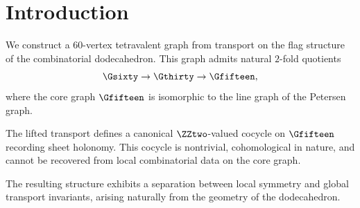 \section{Introduction}

We construct a $60$-vertex tetravalent graph from transport on the flag
structure of the combinatorial dodecahedron. This graph admits natural
$2$-fold quotients
\[
\Gsixty \to \Gthirty \to \Gfifteen,
\]
where the core graph $\Gfifteen$ is isomorphic to the line graph of the
Petersen graph.

The lifted transport defines a canonical $\ZZtwo$-valued cocycle on
$\Gfifteen$ recording sheet holonomy. This cocycle is nontrivial,
cohomological in nature, and cannot be recovered from local combinatorial
data on the core graph.

The resulting structure exhibits a separation between local symmetry and
global transport invariants, arising naturally from the geometry of the
dodecahedron.
